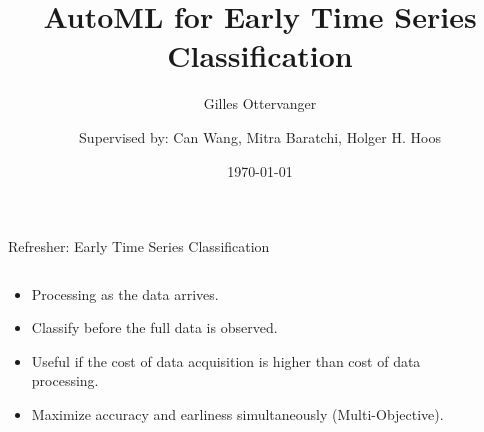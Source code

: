 \documentclass[t,11pt,aspectratio=169]{beamer}
\subtitle{Gilles Ottervanger}
\date{\today}
\title{AutoML for Early Time Series Classification}
\author{Supervised by: Can Wang, Mitra Baratchi, Holger H. Hoos}
\institute{}
\begin{document}
\nonstopmode %



{
\begin{frame}[plain]
  \maketitle
\end{frame}
\addtocounter{framenumber}{-1}%
}

\begin{frame}[fragile]{Refresher: Early Time Series Classification}
\begin{columns}
\begin{column}{.45\textwidth}
\setlength{\parskip}{10pt}
\begin{itemize}[<+->]
    \item Processing as the data arrives.
    \item Classify before the full data is observed.
    \item Useful if the cost of data \alert{acquisition} is higher than cost of data \alert{processing}.
    \item Maximize \alert{accuracy} and \alert{earliness} simultaneously (Multi-Objective).
\end{itemize}
\end{column}
\begin{column}{.45\textwidth}
\vspace{-.5cm}
\end{column}
\end{columns}
\end{frame}
\end{document}
